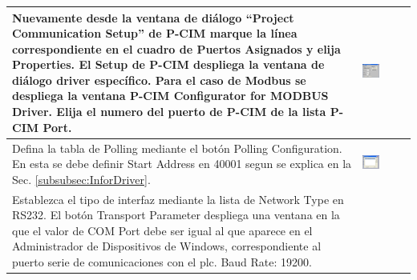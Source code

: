 \begin{table}[H]
\centering
\renewcommand*{\arraystretch}{0.01}
\begin{tabular}{*{2}{m{}}}
\hline
  Nuevamente desde la ventana de diálogo ``Project Communication Setup'' de
  P-CIM marque la línea correspondiente en el cuadro de Puertos Asignados y 
  elija  Properties. El Setup de P-CIM despliega la ventana de diálogo driver 
  específico. Para el caso de Modbus se despliega la ventana P-CIM Configurator 
  for MODBUS Driver. Elija el numero del puerto de P-CIM de la lista P-CIM Port.
  &\begin{center}
    \includegraphics[width=0.4\textwidth]
      {Cap5-SCADA/images/modbusDriver.jpeg}
  \end{center}\\
\hline
  Defina la tabla de Polling mediante el botón Polling Configuration. En esta 
  se debe definir Start Address en 40001 segun se explica en la 
  Sec. \ref{subsubsec:InforDriver}.
  &\begin{center}
        \includegraphics[width=0.4\textwidth]
      {Cap5-SCADA/images/modbusDriver1.jpeg}
  \end{center}\\
\hline 
   Establezca el tipo de interfaz mediante la lista de Network Type en RS232. 
   El botón Transport Parameter despliega una ventana en la que el valor de COM 
   Port debe ser igual al que aparece en el Administrador de 
   Dispositivos de Windows, correspondiente al puerto serie de
   comunicaciones con el \gls{plc}. Baud Rate: 19200.

\end{tabular}
\end{table}
